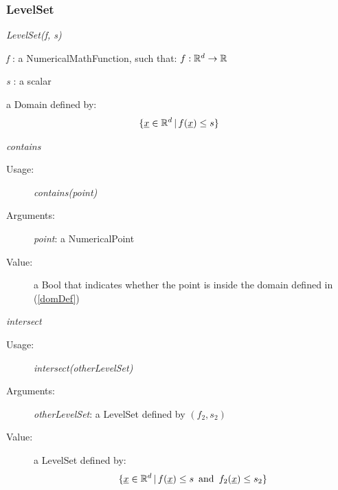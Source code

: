 \subsubsection{LevelSet}

\begin{description}

\item[Usage:]  \textit{LevelSet(f, s)}


\item[Arguments:]  \rule{0pt}{1em}
\begin{description}
\item \textit{f}  :  a NumericalMathFunction, such that: $f: {\mathbb R}^d \rightarrow {\mathbb R}$
\item \textit{s}    :   a scalar
\end{description}

\item[Value:] a Domain defined by: 
\begin{align}\label{domDef}
\{ {\underline{x}} \in {\mathbb R}^d \, | \, f({\underline{x}}) \leq s \}
\end{align}

\item[Some methods :]  \rule{0pt}{1em}

\begin{description}



\item \textit{contains}
\begin{description}
\item[Usage:] \textit{contains(point)}
\item[Arguments:] \textit{point}: a NumericalPoint
\item[Value:]  a Bool that indicates whether the point is inside the domain defined in (\ref{domDef})
\end{description}



\item \textit{intersect}
\begin{description}
\item[Usage:] \textit{intersect(otherLevelSet)}
\item[Arguments:] \textit{otherLevelSet}: a LevelSet defined by $(f_2, s_2)$ 
\item[Value:]  a LevelSet defined by: 
\begin{align}\label{domDef2}
\{ {\underline{x}} \in {\mathbb R}^d \, | \, f({\underline{x}}) \leq s \, \mbox{ and } \, f_2({\underline{x}}) \leq s_2\}
\end{align}
\end{description}



\end{description}
\end{description}
